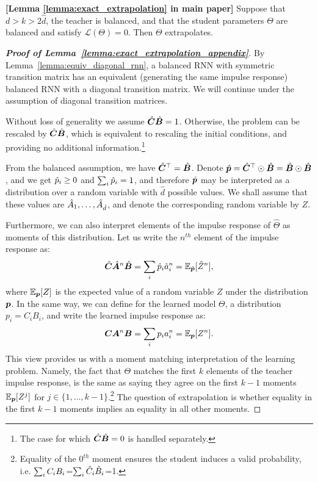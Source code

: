 \begin{lemma}\textbf{[Lemma \ref{lemma:exact_extrapolation} in main paper]} 
\label{lemma:exact_extrapolation_appendix}
Suppose that $d > k > 2\hat{d}$, the teacher is balanced, and that the student parameters $\Theta$ are balanced and satisfy $\mathcal{L} ( \Theta ) = 0$. Then $\Theta$ extrapolates.
\end{lemma}
\begin{proof}[\textbf{Proof of Lemma~\ref{lemma:exact_extrapolation_appendix}}]
By Lemma~\ref{lemma:equiv_diagonal_rnn}, a balanced RNN with symmetric transition matrix has an equivalent (generating the same impulse response) balanced RNN with a diagonal transition matrix. We will continue under the assumption of diagonal transition matrices. 

Without loss of generality we assume $\hat{{\bm{C}}}\hat{{\bm{B}}}=1$. Otherwise, the problem can be rescaled by $\hat{{\bm{C}}}\hat{{\bm{B}}}$, which is equivalent to rescaling the initial conditions, and providing no additional information.\footnote{The case for which $\hat{{\bm{C}}}\hat{{\bm{B}}}=0$ is handled separately.}

From the balanced assumption, we have $\hat{{\bm{C}}}^\top=\hat{{\bm{B}}}$. Denote $\hat{{\bm{p}}} = \hat{{\bm{C}}}^\top \odot \hat{{\bm{B}}}=\hat{{\bm{B}}}\odot \hat{{\bm{B}}}$, and we get $\hat{{p}}_i\geq 0$ and $\sum_i \hat{{p}}_i=1$,  and therefore $\hat{{\bm{p}}}$ may be interpreted as a distribution over a random variable with $\hat{d}$ possible values. We shall assume that these values are $\hat{{A}}_1,\ldots,\hat{{A}}_{\hat{d}}$, and denote the corresponding random variable by $Z$.

Furthermore, we can also interpret elements of the impulse response of $\hat{\Theta}$ as moments of this distribution.
Let us write the $n^{th}$ element of the impulse response as:
\begin{equation}
\hat{{\bm{C}}} \hat{{\bm{A}}}^n \hat{{\bm{B}}} = \sum_i \hat{{p}}_i \hat{a}_i ^n = \mathbb{E}_{\hat{{\bm{p}}}}[\hat{Z}^n],
\end{equation}
where $\mathbb{E}_{{\bm{p}}}[Z]$ is the expected value of a random variable $Z$ under the distribution ${\bm{p}}$.
In the same way, we can define for the learned model $\Theta$, a distribution $p_i = {C}_i {B}_i$, and write the learned impulse response as:
\begin{equation}
{\bm{C}} {\bm{A}}^n {\bm{B}} = \sum_i {p}_i a_i ^n = \mathbb{E}_{{\bm{p}}}[{Z}^n].
\end{equation}
This view provides us with a moment matching interpretation of the learning problem. Namely, the fact that $\Theta$ matches the first $k$ elements of the teacher impulse response, is the same as saying they agree on the first $k-1$ moments $\mathbb{E}_{{\bm{p}}}[{Z}^j]$ for $j\in\{1,\ldots, k-1\}$.\footnote{Equality of the $0^{th}$ moment ensures the student induces a valid probability, i.e. $\sum_{i}{C}_i{B}_i$=$\sum_{i}\hat{{C}}_i\hat{{B}}_i$=1.} The question of extrapolation is whether equality in the first $k-1$ moments implies an equality in all other moments.



\end{proof}
